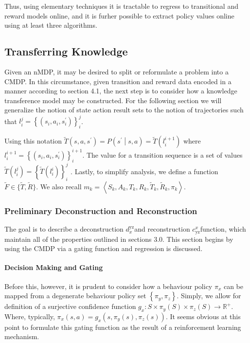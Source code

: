 \documentclass[compsoc,journal,letterpaper,10pt,draftcls,twocolumn]{IEEEtran}
\begin{document}
Thus, using elementary techniques it is tractable to regress to
transitional and reward models online, and it is furher possible to
extract policy values online using at least three algorithms.

\subsection{Transferring Knowledge}\label{transferring-knowledge}

Given an nMDP, it may be desired to split or reformulate a problem into
a CMDP. In this circumstance, given transition and reward data encoded
in a manner according to section 4.1, the next step is to consider how a
knowledge transference model may be constructed. For the following
section we will generalize the notion of state action result sets to the
notion of trajectories such that
$l_{i}^{j} = \left\{ (s_{i},a_{i},s_{i}^{\prime}) \right\}_{i}^{j}$.

Using this notation
$\tilde{T}\left( s,a,s^\prime \right) = P\left( s^{\prime}\middle | s, a \right) = \tilde{T}\left( l_{i}^{i + 1} \right)$ where
$l_{i}^{i + 1} = \left\{ (s_{i},a_{i},s_{i}^{\prime}) \right\}_{i}^{i + 1}$.
The value for a transition sequence is a set of values
\(\tilde{T}\left( l_{i}^{j} \right) = \left\{ \tilde{T}\left( l_{i}^{i} \right) \right\}_{i}^{j}\)
. Lastly, to simplify analysis, we define a function
$\tilde{F}\in\{\tilde{T},\tilde{R}\}$. We also recall
$m_{k} = \left\langle S_{k},A_{k},T_{k},R_{k},{\tilde{T}}_{k},{\tilde{R}}_{k},\pi_{k} \right\rangle$.

\subsubsection{Preliminary Deconstruction and Reconstruction
}\label{preliminary-deconstruction-and-reconstruction}

The goal is to describe a deconstruction \(d_{x}^{\text{yz}}\)and
reconstruction \(c_{\text{yz}}^{x}\)function, which maintain all of the
properties outlined in sections 3.0. This section begins by using the
CMDP via a gating function and regression is discussed.

\paragraph{Decision Making and
Gating}\label{decision-making-and-gating}

Before this, however, it is prudent to consider how a behaviour policy
\(\pi_{x}\) can be mapped from a degenerate behaviour policy set
\(\left\{ \pi_{y},\pi_{z} \right\}\). Simply, we allow for definition of
a surjective confidence function
\(g_{x}:S \times \pi_{y}(S) \times \pi_{z}(S) \rightarrow \mathbb{R}^{+}\).
Where, typically,
\(\pi_{x}\left( s,a \right) = {g_{x}\left( s,\pi_{y}\left( s \right),\pi_{z}(s) \right)}\).
It seems obvious at this point to formulate this gating function as the
result of a reinforcement learning mechanism.
\end{document}
